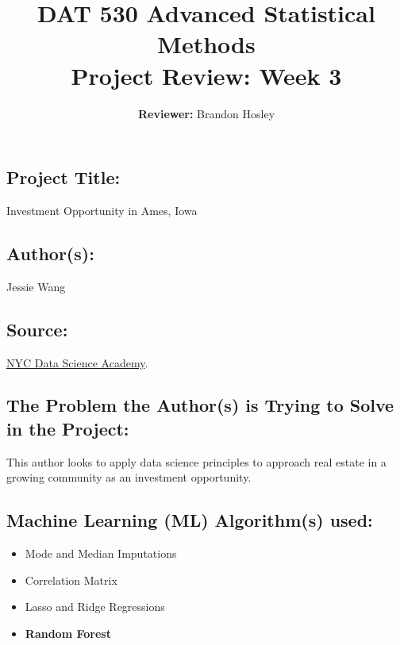 \documentclass[]{article}
\title{\textbf{DAT 530 Advanced Statistical Methods}\\
	\normalsize{Project Review: Week 3} }
\author{\textbf{Reviewer: }
	Brandon Hosley}
\begin{document}
\setlength{\droptitle}{-10em} 
\pretitle{\begin{flushleft}\LARGE} %
	\posttitle{\end{flushleft}}
\preauthor{\begin{flushleft}\large} %
	\postauthor{\end{flushleft}}
\predate{\begin{flushleft}\large} %
	\postdate{\end{flushleft}}
\maketitle

\vspace{-2em}

\subsection*{Project Title:}
Investment Opportunity in Ames, Iowa

\subsection*{Author(s):}
Jessie Wang

\subsection*{Source:}
\href{https://nycdatascience.com/blog/student-works/investment-opportunity-in-ames-iowa/}{NYC Data Science Academy}.

\subsection*{The Problem the Author(s) is Trying to Solve in the Project:}
This author looks to apply data science principles to approach real estate in a growing community as an investment opportunity.

\subsection*{Machine Learning (ML) Algorithm(s) used:}
\begin{itemize}
	\item Mode and Median Imputations
	\item Correlation Matrix
	\item Lasso and Ridge Regressions
	\item \textbf{Random Forest}
\end{itemize}
\end{document}
